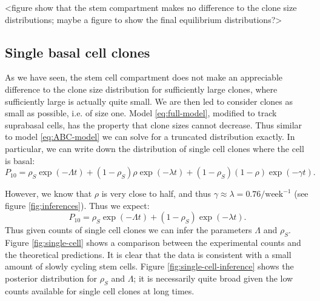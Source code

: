 \documentclass[10pt,UKenglish]{article}
\begin{document}
<figure show that the stem compartment makes no difference to the clone size distributions; maybe a figure to show the final equilibrium distributions?>

\subsection{\label{sec:single-cells}Single basal cell clones}

As we have seen, the stem cell compartment does not make an appreciable difference to the clone size distribution for sufficiently large clones, where sufficiently large is actually quite small. We are then led to consider clones as small as possible, i.e. of size one. Model \ref{eq:full-model}, modified to track suprabasal cells, has the property that clone sizes cannot decrease. Thus similar to model \ref{eq:ABC-model} we can solve for a truncated distribution exactly. In particular, we can write down the distribution of single cell clones where the cell is basal:
\begin{equation*}
P_{10} = \rho_S \exp(-\Lambda t) + (1-\rho_S) \rho \exp(-\lambda t) + (1-\rho_S) (1-\rho) \exp(-\gamma t).
\end{equation*}

However, we know that $\rho$ is very close to half, and thus $\gamma \approx \lambda = 0.76/\textrm{week}^{-1}$ (see figure \ref{fig:inferences}). Thus we expect: 
\begin{equation*}
P_{10} = \rho_S \exp(-\Lambda t) + (1-\rho_S) \exp(-\lambda t).
\end{equation*}
Thus given counts of single cell clones we can infer the parameters $\Lambda$ and $\rho_S$. Figure \ref{fig:single-cell} shows a comparison between the experimental counts and the theoretical predictions. It is clear that the data is consistent with a small amount of slowly cycling stem cells. Figure \ref{fig:single-cell-inference} shows the posterior distribution for $\rho_S$ and $\Lambda$; it is necessarily quite broad given the low counts available for single cell clones at long times.
\end{document}
